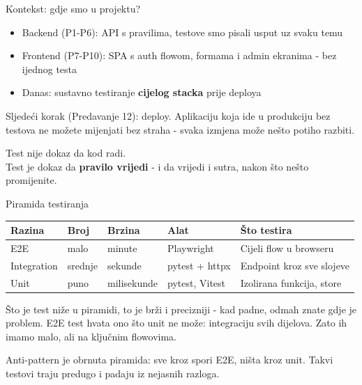 \begin{frame}{Kontekst: gdje smo u projektu?}
\begin{itemize}
  \item Backend (P1-P6): API s pravilima, testove smo pisali usput uz svaku temu
  \item Frontend (P7-P10): SPA s auth flowom, formama i admin ekranima - bez ijednog testa
  \item Danas: sustavno testiranje \textbf{cijelog stacka} prije deploya
\end{itemize}

\vspace{0.6em}
Sljedeći korak (Predavanje 12): deploy. Aplikaciju koja ide u produkciju bez testova ne možete mijenjati bez straha - svaka izmjena može nešto potiho razbiti.
\end{frame}

\begin{frame}{}
\begin{center}
\Large Test nije dokaz da kod radi. \\[0.5em]
Test je dokaz da \textbf{pravilo vrijedi} - i da vrijedi i sutra, nakon što nešto promijenite.
\end{center}
\end{frame}

\begin{frame}{Piramida testiranja}
\begin{tabular}{@{}llllp{3.2cm}@{}}
  \toprule
  \textbf{Razina} & \textbf{Broj} & \textbf{Brzina} & \textbf{Alat} & \textbf{Što testira} \\
  \midrule
  E2E & malo & minute & Playwright & Cijeli flow u browseru \\
  Integration & srednje & sekunde & pytest + httpx & Endpoint kroz sve slojeve \\
  Unit & puno & milisekunde & pytest, Vitest & Izolirana funkcija, store \\
  \bottomrule
\end{tabular}

\vspace{0.6em}
Što je test niže u piramidi, to je brži i precizniji - kad padne, odmah znate gdje je problem. E2E test hvata ono što unit ne može: integraciju svih dijelova. Zato ih imamo malo, ali na ključnim flowovima.

\vspace{0.4em}
Anti-pattern je obrnuta piramida: sve kroz spori E2E, ništa kroz unit. Takvi testovi traju predugo i padaju iz nejasnih razloga.
\end{frame}

